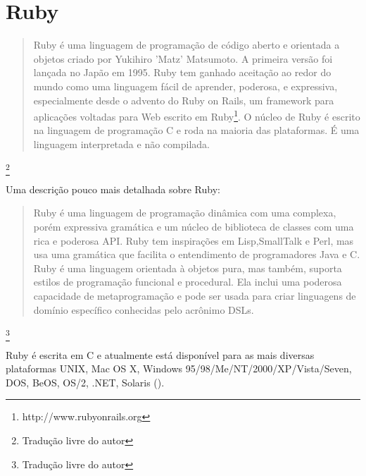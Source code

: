 \chapter{Ruby}

\begin{quote} 
Ruby é uma linguagem de programação de código aberto e orientada a objetos criado por Yukihiro 'Matz' Matsumoto. A primeira versão foi lançada no Japão em 1995. Ruby tem ganhado aceitação ao redor do mundo como uma linguagem fácil de aprender, poderosa, e expressiva, especialmente desde o advento do Ruby on Rails, um framework para aplicações voltadas para Web escrito em Ruby\footnote{http://www.rubyonrails.org}. O núcleo de Ruby é escrito na linguagem de programação C e roda na maioria das plataformas. É uma linguagem interpretada e não compilada.
\cite{ruby_pocket_reference}
\end{quote}
\footnote{Tradução livre do autor}

Uma descrição pouco mais detalhada sobre Ruby: 
\begin{quote}
Ruby é uma linguagem de programação dinâmica com uma complexa, porém expressiva gramática e um núcleo de  biblioteca de classes com uma rica e poderosa API. Ruby tem inspirações em Lisp,SmallTalk e Perl, mas usa uma gramática que facilita o entendimento de programadores Java e C. Ruby é uma linguagem orientada à objetos pura, mas também, suporta estilos de programação funcional e procedural. Ela inclui uma poderosa capacidade de metaprogramação e pode ser usada para criar linguagens de domínio específico conhecidas pelo acrônimo DSLs.
\cite{the_ruby_programing_language}
\end{quote}
\footnote{Tradução livre do autor}

Ruby é escrita em C e atualmente está disponível para as mais diversas plataformas UNIX, Mac OS X, Windows 95/98/Me/NT/2000/XP/Vista/Seven, DOS, BeOS, OS/2, .NET, Solaris (\cite{ruby_official_website}).

